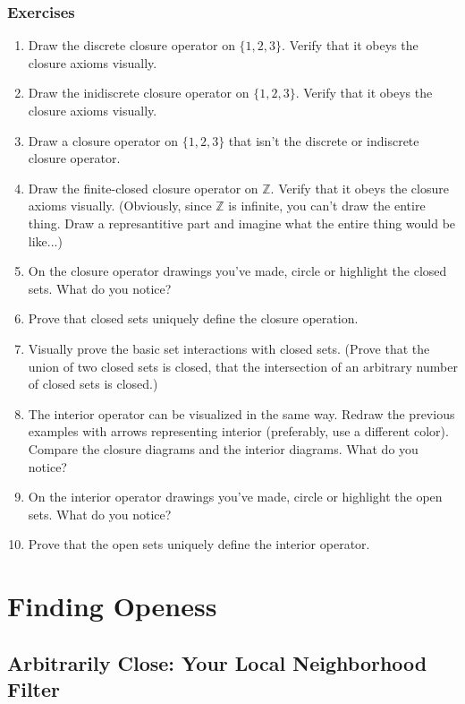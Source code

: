 \documentclass{report}
\begin{document}
\subsection*{Exercises}

\begin{enumerate}

\item Draw the discrete closure operator on $\{1,2,3\}$. Verify that it obeys the closure axioms visually.
\item Draw the inidiscrete closure operator on $\{1,2,3\}$. Verify that it obeys the closure axioms visually.
\item Draw a closure operator on $\{1,2,3\}$ that isn't the discrete or indiscrete closure operator.
\item Draw the finite-closed closure operator on $ℤ$. Verify that it obeys the closure axioms visually. (Obviously, since $ℤ$ is infinite, you can't draw the entire thing. Draw a represantitive part and imagine what the entire thing would be like...)
\item On the closure operator drawings you've made, circle or highlight the closed sets. What do you notice?
\item Prove that closed sets uniquely define the closure operation.
\item Visually prove the basic set interactions with closed sets. (Prove that the union of two closed sets is closed, that the intersection of an arbitrary number of closed sets is closed.)
\item The interior operator can be visualized in the same way. Redraw the previous examples with arrows representing interior (preferably, use a different color). Compare the closure diagrams and the interior diagrams. What do you notice?
\item On the interior operator drawings you've made, circle or highlight the open sets. What do you notice?
\item Prove that the open sets uniquely define the interior operator.



\end{enumerate}

\chapter{Finding Openess}

\section{Arbitrarily Close: Your Local Neighborhood Filter}
\end{document}
